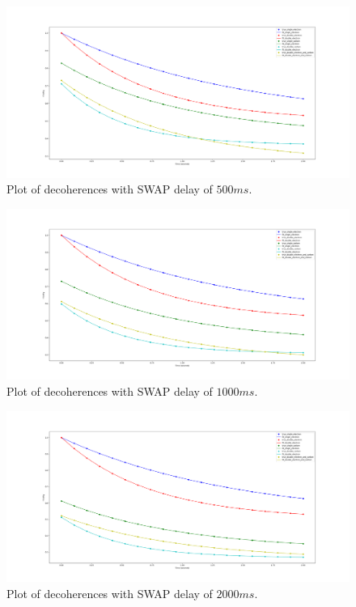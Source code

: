 \documentclass{article}
\begin{document}
\begin{figure}[!htb]
    \centering
    \includegraphics[width=\textwidth]{figures/decoherence_swap_delay_500ms.png}
    \caption{Plot of decoherences with SWAP delay of $500ms$.}
    \label{fig:decoherence_500_delay}
\end{figure}

\begin{figure}[!htb]
    \centering
    \includegraphics[width=\textwidth]{figures/decoherence_swap_delay_1000ms.png}
    \caption{Plot of decoherences with SWAP delay of $1000ms$.}
    \label{fig:decoherence_1000_delay}
\end{figure}

\begin{figure}[!htb]
    \centering
    \includegraphics[width=\textwidth]{figures/decoherence_swap_delay_2000ms.png}
    \caption{Plot of decoherences with SWAP delay of $2000ms$.}
    \label{fig:decoherence_2000_delay}
\end{figure}
\end{document}
